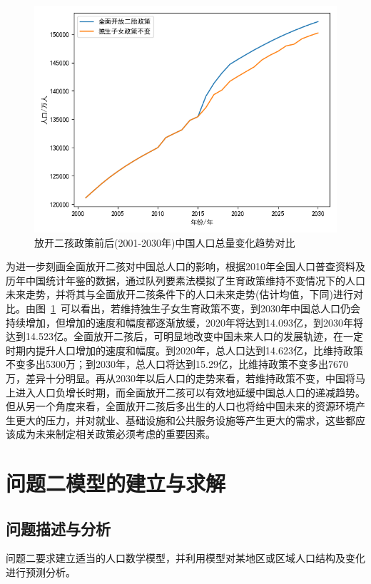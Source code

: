 \documentclass{whutmod}
\begin{document}
\begin{figure}[H]
  	\centering
  	\includegraphics[width=\textwidth]{figures/da.png}
  	\caption{放开二孩政策前后(2001-2030年)中国人口总量变化趋势对比}\label{lsdasdsssct}
  \end{figure}
    
  为进一步刻画全面放开二孩对中国总人口的影响，根据2010年全国人口普查资料及历年中国统计年鉴的数据，通过队列要素法模拟了生育政策维持不变情况下的人口未来走势，并将其与全面放开二孩条件下的人口未来走势(估计均值，下同)进行对比。由图~\ref{lsdasdsssct}~可以看出，若维持独生子女生育政策不变，到2030年中国总人口仍会持续增加，但增加的速度和幅度都逐渐放缓，2020年将达到14.093亿，到2030年将达到14.523亿。全面放开二孩后，可明显地改变中国未来人口的发展轨迹，在一定时期内提升人口增加的速度和幅度。到2020年，总人口达到14.623亿，比维持政策不变多出5300万；到2030年，总人口将达到15.29亿，比维持政策不变多出7670万，差异十分明显。再从2030年以后人口的走势来看，若维持政策不变，中国将马上进入人口负增长时期，而全面放开二孩可以有效地延缓中国总人口的递减趋势。但从另一个角度来看，全面放开二孩后多出生的人口也将给中国未来的资源环境产生更大的压力，并对就业、基础设施和公共服务设施等产生更大的需求，这些都应该成为未来制定相关政策必须考虑的重要因素。
  
  
	\section{问题二模型的建立与求解}
		\subsection{问题描述与分析}
		问题二要求建立适当的人口数学模型，并利用模型对某地区或区域人口结构及变化进行预测分析。
		
\end{document}
